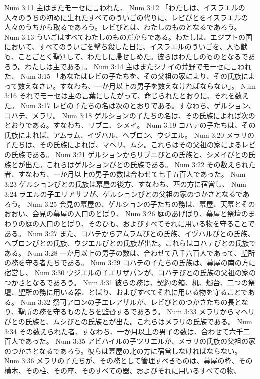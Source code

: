 Num 3:11  主はまたモーセに言われた、
Num 3:12  「わたしは、イスラエルの人々のうちの初めに生れたすべてのういごの代りに、レビびとをイスラエルの人々のうちから取るであろう。レビびとは、わたしのものとなるであろう。
Num 3:13  ういごはすべてわたしのものだからである。わたしは、エジプトの国において、すべてのういごを撃ち殺した日に、イスラエルのういごを、人も獣も、ことごとく聖別して、わたしに帰せしめた。彼らはわたしのものとなるであろう。わたしは主である」。
Num 3:14  主はまたシナイの荒野でモーセに言われた、
Num 3:15  「あなたはレビの子たちを、その父祖の家により、その氏族によって数えなさい。すなわち、一か月以上の男子を数えなければならない」。
Num 3:16  それでモーセは主の言葉にしたがって、命じられたとおりに、それを数えた。
Num 3:17  レビの子たちの名は次のとおりである。すなわち、ゲルション、コハテ、メラリ。
Num 3:18  ゲルションの子たちの名は、その氏族によれば次のとおりである。すなわち、リブニ、シメイ。
Num 3:19  コハテの子たちは、その氏族によれば、アムラム、イヅハル、ヘブロン、ウジエル。
Num 3:20  メラリの子たちは、その氏族によれば、マヘリ、ムシ。これらはその父祖の家によるレビの氏族である。
Num 3:21  ゲルションからリブニびとの氏族と、シメイびとの氏族とが出た。これらはゲルションびとの氏族である。
Num 3:22  その数えられた者、すなわち、一か月以上の男子の数は合わせて七千五百人であった。
Num 3:23  ゲルションびとの氏族は幕屋の後方、すなわち、西の方に宿営し、
Num 3:24  ラエルの子エリアサフが、ゲルションびとの父祖の家のつかさとなるであろう。
Num 3:25  会見の幕屋の、ゲルションの子たちの務は、幕屋、天幕とそのおおい、会見の幕屋の入口のとばり、
Num 3:26  庭のあげばり、幕屋と祭壇のまわりの庭の入口のとばり、そのひも、およびすべてそれに用いる物を守ることである。
Num 3:27  また、コハテからアムラムびとの氏族、イヅハルびとの氏族、ヘブロンびとの氏族、ウジエルびとの氏族が出た。これらはコハテびとの氏族である。
Num 3:28  一か月以上の男子の数は、合わせて八千六百人であって、聖所の務を守る者たちである。
Num 3:29  コハテの子たちの氏族は、幕屋の南の方に宿営し、
Num 3:30  ウジエルの子エリザパンが、コハテびとの氏族の父祖の家のつかさとなるであろう。
Num 3:31  彼らの務は、契約の箱、机、燭台、二つの祭壇、聖所の務に用いる器、とばり、およびすべてそれに用いる物を守ることである。
Num 3:32  祭司アロンの子エレアザルが、レビびとのつかさたちの長となり、聖所の務を守るものたちを監督するであろう。
Num 3:33  メラリからマヘリびとの氏族と、ムシびとの氏族とが出た。これらはメラリの氏族である。
Num 3:34  その数えられた者、すなわち、一か月以上の男子の数は、合わせて六千二百人であった。
Num 3:35  アビハイルの子ツリエルが、メラリの氏族の父祖の家のつかさとなるであろう。彼らは幕屋の北の方に宿営しなければならない。
Num 3:36  メラリの子たちが、その務として管理すべきものは、幕屋の枠、その横木、その柱、その座、そのすべての器、およびそれに用いるすべての物、
